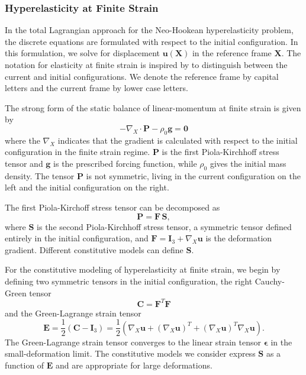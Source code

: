 \subsubsection{Hyperelasticity at Finite Strain}

In the total Lagrangian approach for the Neo-Hookean hyperelasticity problem, the discrete equations are formulated with respect to the initial configuration.
In this formulation, we solve for displacement $\mathbf u \left( \mathbf X \right)$ in the reference frame $\mathbf X$.
The notation for elasticity at finite strain is inspired by \cite{holzapfel2000nonlinear} to distinguish between the current and initial configurations.
We denote the reference frame by capital letters and the current frame by lower case letters.

The strong form of the static balance of linear-momentum at finite strain is given by
\begin{equation}
   - \nabla_X \cdot \mathbf{P} - \rho_0 \mathbf{g} = \mathbf{0}
   \label{eq:sblFinS}
\end{equation} 
where the $\nabla_X$ indicates that the gradient is calculated with respect to the initial configuration in the finite strain regime.
$\mathbf{P}$ is the first Piola-Kirchhoff stress tensor and $\mathbf{g}$ is the prescribed forcing function, while $\rho_0$ gives the initial mass density.
The tensor $\mathbf{P}$ is not symmetric, living in the current configuration on the left and the initial configuration on the right.

The first Piola-Kirchoff stress tensor can be decomposed as
\begin{equation}
   \mathbf{P} = \mathbf{F} \, \mathbf{S},
   \label{eq:1st2nd}
\end{equation}
where $\mathbf{S}$ is the second Piola-Kirchhoff stress tensor, a symmetric tensor defined entirely in the initial configuration, and $\mathbf{F} = \mathbf I_3 + \nabla_X \mathbf u$ is the deformation gradient.
Different constitutive models can define $\mathbf{S}$.

For the constitutive modeling of hyperelasticity at finite strain, we begin by defining two symmetric tensors in the initial configuration, the right Cauchy-Green tensor
\begin{equation}
\mathbf C = \mathbf F^T \mathbf F
\end{equation}
and the Green-Lagrange strain tensor
\begin{equation}
   \mathbf E = \frac 1 2 \left( \mathbf C - \mathbf I_3 \right) = \frac 1 2 \left( \nabla_X \mathbf u + \left( \nabla_X \mathbf u \right)^T + \left( \nabla_X \mathbf u \right)^T \nabla_X \mathbf u \right).
   \label{eq:green-lagrange-strain}
\end{equation}
The Green-Lagrange strain tensor converges to the linear strain tensor $\boldsymbol \epsilon$ in the small-deformation limit.
The constitutive models we consider express $\mathbf S$ as a function of $\mathbf E$ and are appropriate for large deformations.

